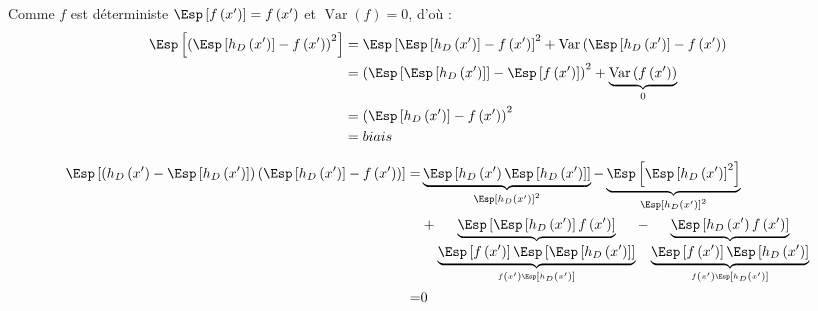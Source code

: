 \begin{reponse}
	Comme $f$ est déterministe $\Esp\left[f\left(x^{\prime}\right)\right] = f\left(x^{\prime}\right)$ et $\operatorname{Var}\left(f\right) = 0$, d'où :
	\begin{align*}
		\Esp\left[\left(\Esp\left[h_D\left({x^{\prime}}\right)\right]-f\left(x^{\prime}\right)\right)^2\right]
		 & = \Esp\left[\Esp\left[h_D\left({x^{\prime}}\right)\right]-f\left(x^{\prime}\right)\right]^2
		+ \operatorname{Var}\left(\Esp\left[h_D\left({x^{\prime}}\right)\right]-f\left(x^{\prime}\right)\right)                                                                                                 \\
		 & = \left(\Esp\left[\Esp\left[h_D\left({x^{\prime}}\right)\right]\right]-\Esp\left[f\left(x^{\prime}\right)\right]\right)^2 + \underbrace{\operatorname{Var}\left(f\left(x^{\prime}\right)\right)}_{0} \\
		 & = \left(\Esp\left[h_D\left({x^{\prime}}\right)\right]-f\left(x^{\prime}\right)\right)^2                                                                                                              \\
		 & = biais
	\end{align*}

	\begin{align*}
		\Esp\left[\left(h_D\left({x^{\prime}}\right) - \Esp\left[h_D\left({x^{\prime}}\right)\right]\right)\left(\Esp\left[h_D\left({x^{\prime}}\right)\right]-f\left(x^{\prime}\right)\right)\right]
		=  & \underbrace{\Esp\left[h_D\left({x^{\prime}}\right)\Esp\left[h_D\left({x^{\prime}}\right)\right]\right]}_{\Esp\left[h_D\left({x^{\prime}}\right)\right]^{2}}
		-\underbrace{\Esp\left[\Esp\left[h_D\left({x^{\prime}}\right)\right]^{2}\right]}_{\Esp\left[h_D\left({x^{\prime}}\right)\right]^{2}}                                                                                                                                                                     \\
		{} & +\underbrace{\Esp\left[\Esp\left[h_D\left({x^{\prime}}\right)\right]f\left(x^{\prime}\right)\right]}_{\underbrace{\Esp\left[f\left(x^{\prime}\right)\right]\Esp\left[\Esp\left[h_D\left({x^{\prime}}\right)\right]\right]}_{f\left(x^{\prime}\right)\Esp\left[h_D\left({x^{\prime}}\right)\right]}}
		- \underbrace{\Esp\left[h_D\left({x^{\prime}}\right) f\left(x^{\prime}\right)\right]}_{\underbrace{\Esp\left[f\left(x^{\prime}\right)\right]\Esp\left[h_D\left({x^{\prime}}\right)\right]}_{f\left(x^{\prime}\right)\Esp\left[h_D\left({x^{\prime}}\right)\right]}}                                      \\
		=  & 0
	\end{align*}


\end{reponse}
